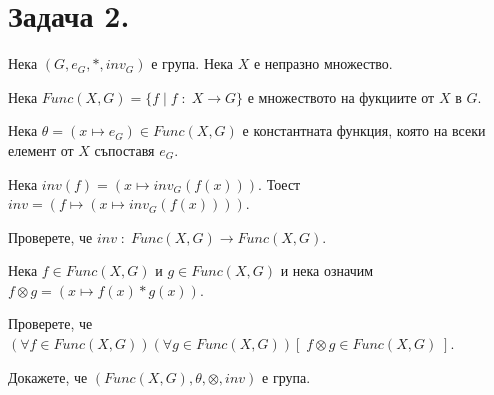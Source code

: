 \documentclass{article}[12pt]
\begin{document}
\section*{Задача 2.}

Нека \((G, e_G, *, inv_G)\) е група. Нека \(X\) е непразно множество.

Нека \(Func(X, G) = \{f \; | \; f \; : \; X \to G\}\) е множеството на фукциите от \(X\) в \(G\).

Нека \(\theta = (x \mapsto e_G) \in Func(X, G)\) е константната функция, която на всеки елемент от \(X\) съпоставя \(e_G\).

Нека \(inv(f) = (x \mapsto inv_G(f(x)))\). Тоест \(inv = (f \mapsto (x \mapsto inv_G(f(x))))\).

Проверете, че \(inv \; : \; Func(X, G) \to Func(X, G)\).

Нека \(f \in Func(X, G)\) и \(g \in Func(X, G)\) и нека означим \\
\(f \otimes g = (x \mapsto f(x) * g(x))\).

Проверете, че \((\forall f \in Func(X, G))(\forall g \in Func(X, G))[\; f \otimes g \in Func(X, G) \;]\).

Докажете, че \((Func(X, G), \theta, \otimes, inv)\) е група.
\end{document}
